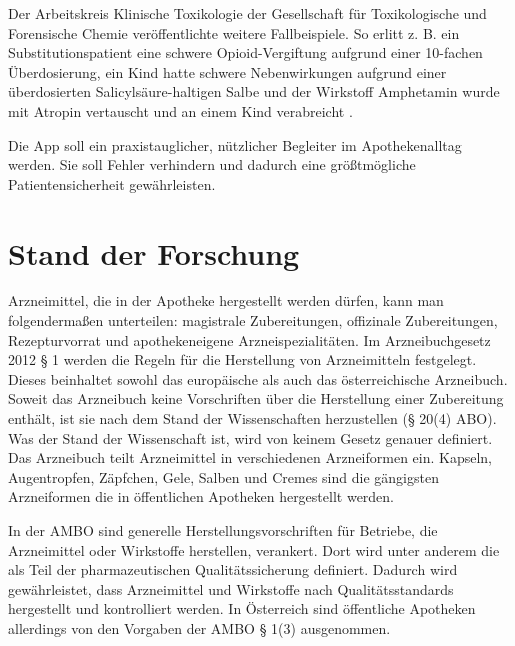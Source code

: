 \documentclass[12pt,a4paper]{article}
\begin{document}
Der Arbeitskreis Klinische Toxikologie der Gesellschaft für Toxikologische und Forensische
Chemie veröffentlichte weitere Fallbeispiele. So erlitt z. B.  ein Substitutionspatient eine schwere Opioid-Vergiftung aufgrund einer 10-fachen Überdosierung, ein Kind hatte schwere Nebenwirkungen aufgrund einer überdosierten Salicylsäure-haltigen Salbe und der Wirkstoff Amphetamin wurde mit Atropin vertauscht und an einem Kind verabreicht \cite{DAZ.online.2015}. %



Die App soll ein praxistauglicher, nützlicher Begleiter im Apothekenalltag werden.
Sie soll Fehler verhindern und dadurch eine größtmögliche Patientensicherheit gewährleisten. 











\section{Stand der Forschung}
Arzneimittel, die in der Apotheke hergestellt werden dürfen, kann man folgendermaßen unterteilen: \gls{magistrale Zubereitungen}, \gls{offizinale Zubereitungen}, \gls{Rezepturvorrat} und apothekeneigene Arzneispezialitäten.
Im Arzneibuchgesetz 2012 § 1 werden die Regeln für die Herstellung von Arzneimitteln festgelegt.
Dieses beinhaltet sowohl das europäische als auch das österreichische Arzneibuch.
Soweit das Arzneibuch keine Vorschriften über die Herstellung einer Zubereitung enthält, ist sie nach dem Stand der Wissenschaften herzustellen (§ 20(4) \ac{ABO}).  Was der Stand der Wissenschaft ist, wird von keinem Gesetz genauer definiert. 
Das Arzneibuch teilt Arzneimittel in verschiedenen Arzneiformen ein. Kapseln, Augentropfen, Zäpfchen, Gele, Salben und Cremes sind die gängigsten Arzneiformen die in öffentlichen Apotheken hergestellt werden. 


In der \ac{AMBO} sind generelle Herstellungsvorschriften für Betriebe, die Arzneimittel oder Wirkstoffe herstellen, verankert. 
Dort wird unter anderem die  als Teil der pharmazeutischen Qualitätssicherung definiert. Dadurch wird gewährleistet, dass Arzneimittel und Wirkstoffe nach Qualitätsstandards hergestellt und kontrolliert werden. %
In Österreich sind öffentliche Apotheken allerdings von den Vorgaben der \ac{AMBO} § 1(3) ausgenommen.
\end{document}
